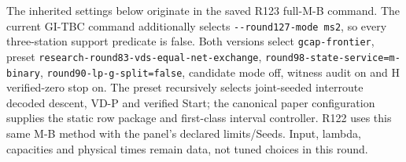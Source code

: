 \documentclass[
  american,
  11pt,
]{article}
\begin{document}
The inherited settings below originate in the saved R123 full-M-B
command. The current GI-TBC command additionally selects
\texttt{-\allowbreak{}-\allowbreak{}round127-\allowbreak{}mode ms2}, so every three-station
support predicate is false. Both versions select
\texttt{gcap-\allowbreak{}frontier}, preset
\texttt{research-\allowbreak{}round83-\allowbreak{}vds-\allowbreak{}equal-\allowbreak{}net-\allowbreak{}exchange},
\texttt{round98-\allowbreak{}state-\allowbreak{}service=m-\allowbreak{}binary},
\texttt{round90-\allowbreak{}lp-\allowbreak{}g-\allowbreak{}split=false}, candidate mode off,
witness audit on and H verified-zero stop on. The preset recursively
selects joint-seeded interroute decoded descent, VD-P and verified
Start; the canonical paper configuration supplies the static row package
and first-class interval controller. R122 uses this same M-B method with
the panel's declared limits/Seeds. Input, lambda, capacities and
physical times remain data, not tuned choices in this round.
\end{document}
